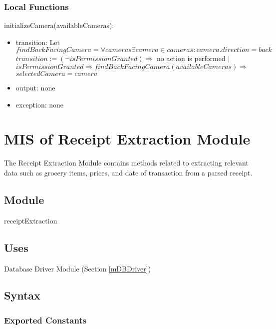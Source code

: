 \documentclass[12pt, titlepage]{article}
\begin{document}
\subsubsection{Local Functions}

\noindent initializeCamera(availableCameras):
\begin{itemize}
  \item transition: Let $findBackFacingCamera = \forall cameras \exists camera \in cameras : camera.direction = back$ \\
                    $transition := (\neg isPermissionGranted) \Rightarrow$ no action is performed $|$\\
                    $isPermissionGranted \Rightarrow findBackFacingCamera(availableCameras) \Rightarrow $ \\
                    $selectedCamera = camera$
  \item output: none
  \item exception: none
\end{itemize}

\newpage

\section{MIS of Receipt Extraction Module} \label{mExtraction}

The Receipt Extraction Module contains methods related to extracting relevant data such as grocery items,
prices, and date of transaction from a parsed receipt.

\subsection{Module}

receiptExtraction

\subsection{Uses}

Database Driver Module (Section \ref{mDBDriver})

\subsection{Syntax}

\subsubsection{Exported Constants}
\end{document}
